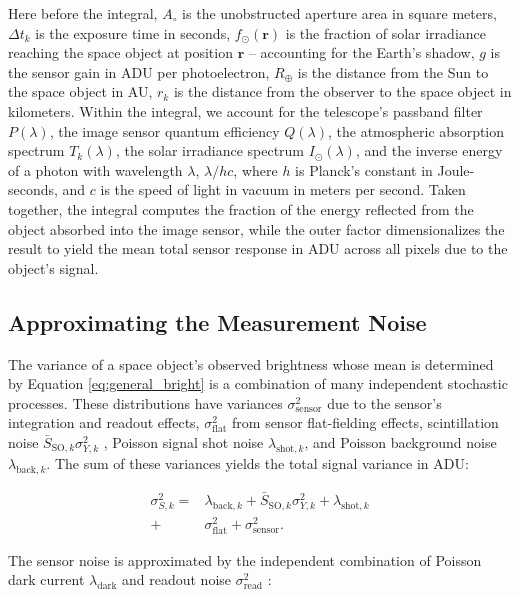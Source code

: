 \documentclass[a4paper,twocolumn]{spaceDebrisC} %
\newcommand{\vctr}[1]{\bm{#1}}
\begin{document}
Here before the integral, $A_\circ$ is the unobstructed aperture area in square meters, $\Delta t_k$ is the exposure time in seconds, $f_\odot(\vctr{r})$ is the fraction of solar irradiance reaching the space object at position $\vctr{r}$ -- accounting for the Earth's shadow, $g$ is the sensor gain in ADU per photoelectron, $R_\oplus$ is the distance from the Sun to the space object in AU, $r_k$ is the distance from the observer to the space object in kilometers. Within the integral, we account for the telescope's passband filter $P(\lambda)$, the image sensor quantum efficiency $Q(\lambda)$, the atmospheric absorption spectrum $T_k(\lambda)$, the solar irradiance spectrum $I_\odot(\lambda)$, and the inverse energy of a photon with wavelength $\lambda$, $\lambda / hc$, where $h$ is Planck's constant in Joule-seconds, and $c$ is the speed of light in vacuum in meters per second. Taken together, the integral computes the fraction of the energy reflected from the object absorbed into the image sensor, while the outer factor dimensionalizes the result to yield the mean total sensor response in ADU across all pixels due to the object's signal.

\subsection{Approximating the Measurement Noise}

The variance of a space object's observed brightness whose mean is determined by Equation \ref{eq:general_bright} is a combination of many independent stochastic processes. These distributions have variances $\sigma^2_\text{sensor}$ due to the sensor's integration and readout effects, $\sigma^2_\text{flat}$ from sensor flat-fielding effects, scintillation noise $\bar{S}_{\text{SO},k} \sigma^2_{Y,k}$ \cite{osborn2015}, Poisson signal shot noise $\lambda_{\text{shot},k}$, and Poisson background noise $\lambda_{\text{back},k}$. The sum of these variances yields the total signal variance in ADU:

\begin{equation} \label{eq:sigma_total}
  \begin{split}
  \sigma^2_{S,k} = &\lambda_{\text{back},k} + \bar{S}_{\text{SO},k} \sigma^2_{Y,k} + \lambda_{\text{shot},k} \\ + &\sigma^2_\text{flat} + \sigma^2_\text{sensor}.
  \end{split}
\end{equation}

The sensor noise is approximated by the independent combination of Poisson dark current $\lambda_\text{dark}$ and readout noise $\sigma_\text{read}^2$ \cite{krag2003}:
\end{document}

